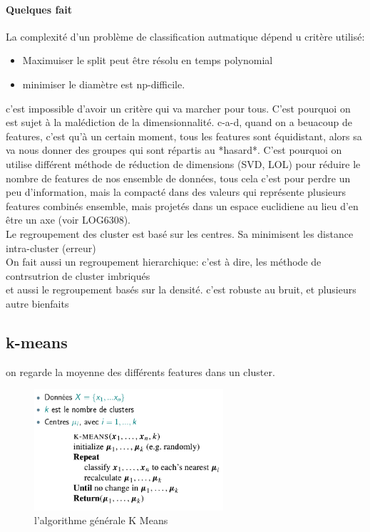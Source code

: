 \documentclass[oneside]{book}
\begin{document}
\paragraph{Quelques fait}
La complexité d'un problème de classification autmatique dépend u critère utilisé:\\

\begin{itemize}
\item Maximuiser le split peut être résolu en temps polynomial
\item minimiser le diamètre est np-difficile.
\end{itemize}

c'est impossible d'avoir un critère qui va marcher pour tous. C'est pourquoi on est sujet à la malédiction de la dimensionnalité. c-a-d, quand on a beuacoup de features, c'est qu'à un certain moment, tous les features sont équidistant, alors sa va nous donner des groupes qui sont répartis au *hasard*. C'est pourquoi on utilise différent méthode de réduction de dimensions (SVD, LOL) pour réduire le nombre de features de nos ensemble de données, tous cela c'est pour perdre un peu d'information, mais la compacté dans des valeurs qui représente plusieurs features combinés ensemble, mais projetés dans un espace euclidiene au lieu d'en être un axe (voir LOG6308). \\

Le regroupement des cluster est basé sur les centres. Sa minimisent les distance intra-cluster (erreur)\\

On fait aussi un regroupement hierarchique: c'est à dire, les méthode de contrsutrion de cluster imbriqués\\

et aussi le regroupement basés sur la densité. c'est robuste au bruit, et plusieurs autre bienfaits\\

\subsection{k-means}
on regarde la moyenne des différents features dans un cluster.\\

\begin{figure}[!ht]
\centering
\includegraphics[width = 7cm]{algo_kmeans.png}
\caption{l'algorithme générale K Means}
\end{figure}
\end{document}
